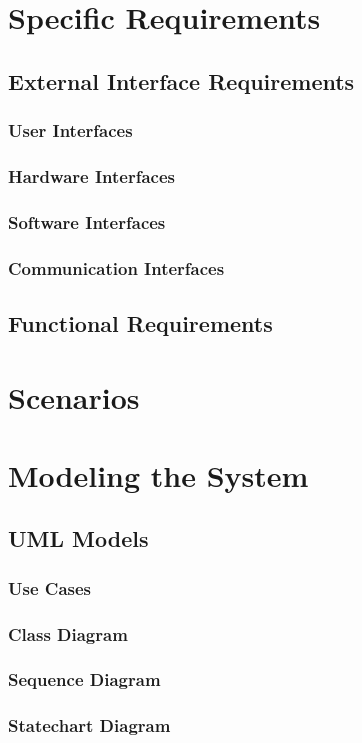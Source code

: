 \documentclass[11pt,a4paper]{report}
\begin{document}
\chapter{Specific Requirements}
\section{External Interface Requirements}
\subsection{User Interfaces}
\subsection{Hardware Interfaces}
\subsection{Software Interfaces}
\subsection{Communication Interfaces}
\section{Functional Requirements}
\chapter{Scenarios}
\chapter{Modeling the System}
\section{UML Models}
\subsection{Use Cases}
\subsection{Class Diagram}
\subsection{Sequence Diagram}
\subsection{Statechart Diagram}
\end{document}
